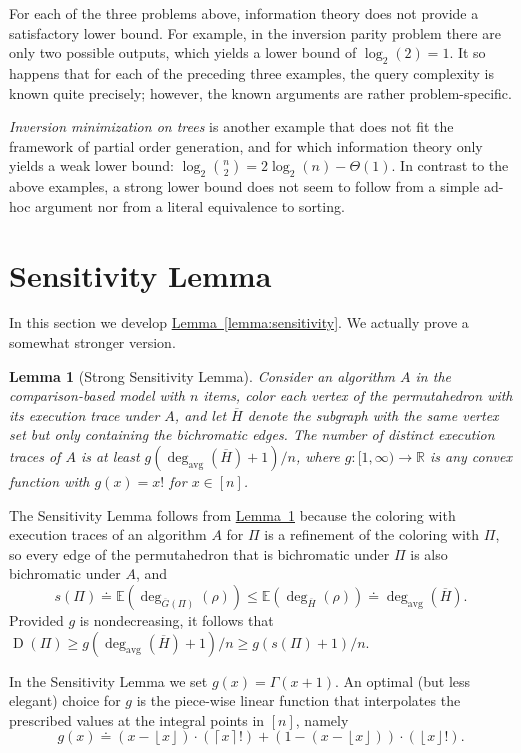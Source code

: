 \documentclass[11pt]{article}
\numberwithin{equation}{section}
\newtheorem{lemma}[theorem]{Lemma}
\theoremstyle{definition}
\theoremstyle{plain}
\newcommand{\expref}[2]{\hyperref[#2]{#1~\ref{#2}}}
\newcommand{\floor}[1]{\left\lfloor #1\right\rfloor}
\newcommand{\ceil}[1]{\left\lceil #1\right\rceil}
\newcommand{\avgdeg}{\deg_\mathrm{avg}}
\newcommand{\Expect}{\mathbb{E}}
\newcommand{\ranking}{\rho}
\DeclareMathOperator{\traces}{D}
\begin{document}
For each of the three problems above, information theory does not provide a satisfactory lower bound. For example, in the inversion parity problem there are only two possible outputs, which yields a lower bound of $\log_2(2)=1$. It so happens that for each of the preceding three examples, the query complexity is known quite precisely; however, the known arguments are rather problem-specific.

\emph{Inversion minimization on trees} is another example that does not fit the framework of partial order generation, and for which information theory only yields a weak lower bound: $\log_2 \binom{n}{2} = 2 \log_2(n) - \Theta(1)$. In contrast to the above examples, a strong lower bound does not seem to follow from a simple ad-hoc argument nor from a literal equivalence to sorting. 



\section{Sensitivity Lemma}
\label{sec:sensitivity}

In this section we develop \expref{Lemma}{lemma:sensitivity}.
We actually prove a somewhat stronger version.

\begin{lemma}[Strong Sensitivity Lemma]\label{lemma:sensitivity:strong}
Consider an algorithm $A$ in the comparison-based
model with $n$ items, color each vertex of the permutahedron with its execution trace under $A$, and let $\overline{H}$ denote the subgraph with the same vertex set but only containing the bichromatic edges. The number of distinct execution traces of $A$ is at least $g(\avgdeg(\overline{H})+1)/n$, where
$g: [1,\infty) \to \mathbb{R}$ is any convex function with $g(x) = x!$ for $x \in [n]$.
\end{lemma}
The Sensitivity Lemma follows from \expref{Lemma}{lemma:sensitivity:strong} because the coloring with execution traces of an algorithm $A$ for $\Pi$ is a refinement of the coloring with $\Pi$, so every edge of the permutahedron that is bichromatic under $\Pi$ is also bichromatic under $A$, and
\[
s(\Pi) \doteq \Expect(\deg_{\overline{G}(\Pi)}(\ranking)) \le \Expect(\deg_{\overline{H}}(\ranking)) \doteq \avgdeg(\overline{H}). 
\]
Provided $g$ is nondecreasing, it follows that $\traces(\Pi) \ge g(\avgdeg(\overline{H})+1)/n \ge g(s(\Pi)+1)/n$.

In the Sensitivity Lemma we set $g(x) = \Gamma(x+1)$. An optimal (but less elegant) choice for $g$ is the piece-wise linear function that interpolates the prescribed values at the integral points in $[n]$, namely
\[    g(x) \doteq
      (x - \floor{x})\cdot(\ceil{x}!)
      +
      (1 - (x - \floor{x}))\cdot(\floor{x}!).
\]      
\end{document}
